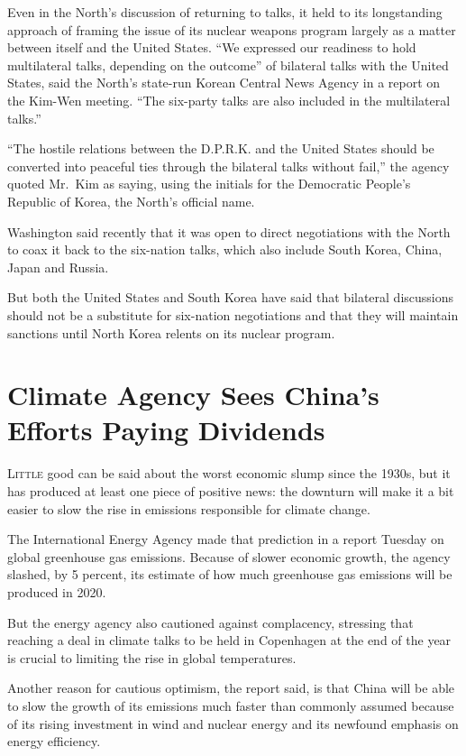 ﻿\documentclass[12pt]{article}
\begin{document}
Even in the North's discussion of returning to talks, it held to its longstanding approach of
framing the issue of its nuclear weapons program largely as a matter between itself and the United
States. ``We expressed our readiness to hold multilateral talks, depending on the outcome'' of
bilateral talks with the United States, said the North's state-run Korean Central News Agency in a
report on the Kim-Wen meeting. ``The six-party talks are also included in the multilateral talks.''

``The hostile relations between the D.P.R.K. and the United States should be converted into peaceful
ties through the bilateral talks without fail,'' the agency quoted Mr.~Kim as saying, using the
initials for the Democratic People's Republic of Korea, the North's official name.

Washington said recently that it was open to direct negotiations with the North to coax it back to
the six-nation talks, which also include South Korea, China, Japan and Russia.

But both the United States and South Korea have said that bilateral discussions should not be a
substitute for six-nation negotiations and that they will maintain sanctions until North Korea
relents on its nuclear program.

\section{Climate Agency Sees China's Efforts Paying Dividends}

\lettrine{L}{ittle} good can be said about the worst economic slump since the
1930s, but it has produced at least one piece of positive news: the downturn will make it a bit
easier to slow the rise in emissions responsible for climate change.

The International Energy Agency made that prediction in a report Tuesday on global greenhouse gas
emissions. Because of slower economic growth, the agency slashed, by 5 percent, its estimate of how
much greenhouse gas emissions will be produced in 2020.

But the energy agency also cautioned against complacency, stressing that reaching a deal in climate
talks to be held in Copenhagen at the end of the year is crucial to limiting the rise in global
temperatures.

Another reason for cautious optimism, the report said, is that China will be able to slow the growth
of its emissions much faster than commonly assumed because of its rising investment in wind and
nuclear energy and its newfound emphasis on energy efficiency.
\end{document}
